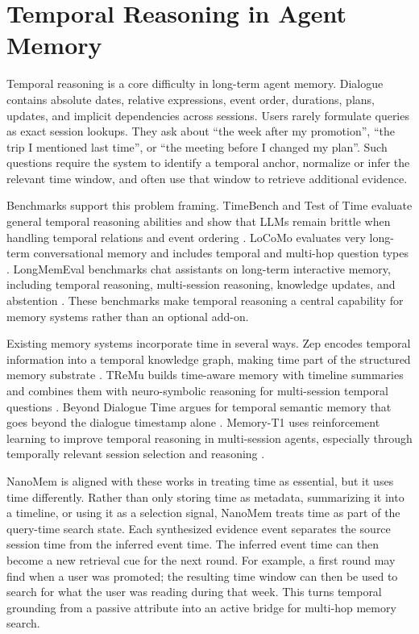 \section{Temporal Reasoning in Agent Memory}
\label{sec:rw-temporal-agent-memory}

Temporal reasoning is a core difficulty in long-term agent memory. Dialogue
contains absolute dates, relative expressions, event order, durations, plans,
updates, and implicit dependencies across sessions. Users rarely formulate
queries as exact session lookups. They ask about ``the week after my
promotion'', ``the trip I mentioned last time'', or ``the meeting before I
changed my plan''. Such questions require the system to identify a temporal
anchor, normalize or infer the relevant time window, and often use that window
to retrieve additional evidence.

Benchmarks support this problem framing. TimeBench and Test of Time evaluate
general temporal reasoning abilities and show that LLMs remain brittle when
handling temporal relations and event ordering
\cite{chu2024timebench,fatemi2025testoftime}. LoCoMo evaluates very long-term
conversational memory and includes temporal and multi-hop question types
\cite{maharana2024locomo}. LongMemEval benchmarks chat assistants on
long-term interactive memory, including temporal reasoning, multi-session
reasoning, knowledge updates, and abstention \cite{wu2024longmemeval}. These
benchmarks make temporal reasoning a central capability for memory systems
rather than an optional add-on.

Existing memory systems incorporate time in several ways. Zep encodes temporal
information into a temporal knowledge graph, making time part of the structured
memory substrate \cite{rasmussen2025zep}. TReMu builds time-aware memory with
timeline summaries and combines them with neuro-symbolic reasoning for
multi-session temporal questions \cite{ge2025tremu}. Beyond Dialogue Time
argues for temporal semantic memory that goes beyond the dialogue timestamp
alone \cite{su2026beyonddialoguetime}. Memory-T1 uses reinforcement learning to
improve temporal reasoning in multi-session agents, especially through
temporally relevant session selection and reasoning \cite{du2026memoryt1}.

NanoMem is aligned with these works in treating time as essential, but it uses
time differently. Rather than only storing time as metadata, summarizing it into
a timeline, or using it as a selection signal, NanoMem treats time as part of
the query-time search state. Each synthesized evidence event separates the
source session time from the inferred event time. The inferred event time can
then become a new retrieval cue for the next round. For example, a first round
may find when a user was promoted; the resulting time window can then be used
to search for what the user was reading during that week. This turns temporal
grounding from a passive attribute into an active bridge for multi-hop memory
search.

